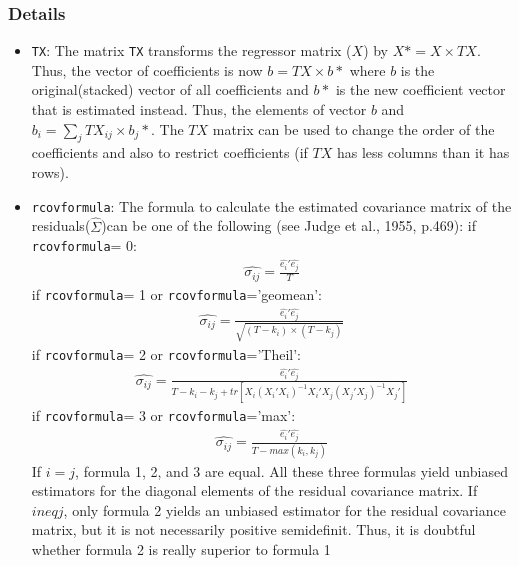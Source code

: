 \subsubsection{Details}
\label{details}
\begin{itemize}
\item \texttt{TX}: The matrix \texttt{TX} transforms the regressor matrix 
($X$) by $X\ast=X \times TX$. Thus,
the vector of coefficients is now $b=TX \times b\ast$ where $b$ is the 
original(stacked) 
vector of all coefficients and $b\ast$ is the new coefficient vector 
that is estimated instead.
Thus, the elements of vector $b$ and $b_i = \sum_j TX_{ij}\times b_j\ast$. The $TX$ matrix can be
used to change the order of the coefficients and also to restrict coefficients (if $TX$ has 
less columns than it has rows).
\item \texttt{rcovformula}: The formula to calculate the estimated covariance matrix of the residuals($\hat{\Sigma}$)can be one
of the following (see Judge et al., 1955, p.469):
if \texttt{rcovformula}= 0:
\begin{eqnarray*}
\hat{\sigma_{ij}}= \frac{\hat{e_i}\prime\hat{e_j}}{T}
\end{eqnarray*}
if \texttt{rcovformula}= 1 or \texttt{rcovformula}='geomean':
\begin{eqnarray*}
\hat{\sigma_{ij}}= \frac{\hat{e_i}\prime\hat{e_j}}{\sqrt{(T-k_i)\times (T-k_j)}}
\end{eqnarray*}
if \texttt{rcovformula}= 2 or \texttt{rcovformula}='Theil':
\begin{eqnarray*}
\hat{\sigma_{ij}}= \frac{\hat{e_i}\prime\hat{e_j}}{T-k_i-k_j+tr[X_i(X_i\prime X_i)^{-1}X_i\prime X_j(X_j\prime X_j)^{-1}X_j\prime]}
\end{eqnarray*}
if \texttt{rcovformula}= 3 or \texttt{rcovformula}='max':
\begin{eqnarray*}
\hat{\sigma_{ij}}= \frac{\hat{e_i}\prime\hat{e_j}}{T-max(k_i,k_j)}
\end{eqnarray*}
If $i = j$, formula 1, 2, and 3 are equal. All these three formulas yield unbiased estimators
for the diagonal elements of the residual covariance matrix. If $i neq j$, only formula 2
yields an unbiased estimator for the residual covariance matrix, but it is not necessarily
positive semidefinit. Thus, it is doubtful whether formula 2 is really superior to formula 1
\end{itemize}
